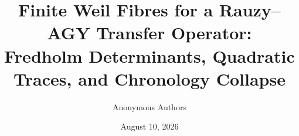 \documentclass[11pt]{article}
\title{Finite Weil Fibres for a Rauzy--AGY Transfer Operator:\\
Fredholm Determinants, Quadratic Traces, and Chronology Collapse}
\author{Anonymous Authors}
\date{August 10, 2026}
\begin{document}
\maketitle

\begin{abstract}

\end{abstract}














\clearpage
\appendix

\end{document}
